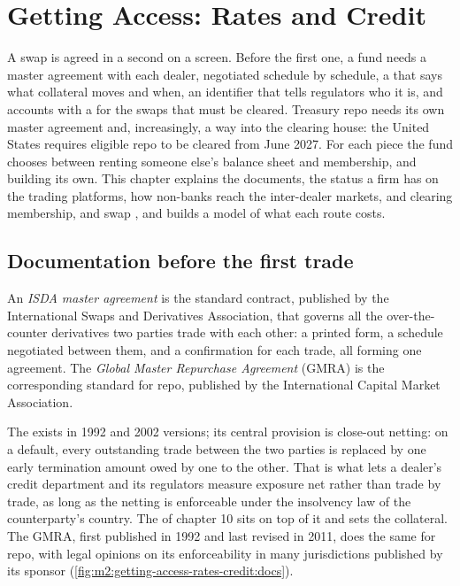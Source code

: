\chapter{Getting Access: Rates and Credit}\label{ch:m2:getting-access-rates-credit}

A swap is agreed in a second on a screen. Before the first one, a fund needs a master
agreement with each dealer, negotiated schedule by schedule, a  that
says what collateral moves and when, an identifier that tells regulators who it is, and
accounts with a  for the swaps that must be cleared. Treasury repo needs
its own master agreement and, increasingly, a way into the clearing house: the United
States requires eligible repo to be cleared from June 2027. For each piece the fund
chooses between renting someone else's balance sheet and membership, and building its
own. This chapter explains the documents, the status a firm has on the trading
platforms, how non-banks reach the inter-dealer markets,  and clearing
membership, and swap , and builds a model of what each route costs.

\section{Documentation before the first trade}

\begin{definition}\label{def:m2:getting-access-rates-credit:isda}
An \emph{ISDA master agreement} is the standard contract,
published by the International Swaps and Derivatives Association, that governs all the
over-the-counter derivatives two parties trade with each other: a printed form, a
schedule negotiated between them, and a confirmation for each trade, all forming one
agreement. The \emph{Global Master Repurchase Agreement} (GMRA) is the corresponding standard for repo, published by the
International Capital Market Association.
\end{definition}

The  exists in 1992 and 2002 versions; its central provision is
close-out netting: on a default, every outstanding trade between the two parties is
replaced by one early termination amount owed by one to the other. That is what lets a
dealer's credit department and its regulators measure exposure net rather than trade by
trade, as long as the netting is enforceable under the insolvency law of the
counterparty's country. The  of chapter 10 sits on top of it and
sets the collateral. The GMRA, first published in 1992 and last revised in 2011, does
the same for repo, with legal opinions on its enforceability in many jurisdictions
published by its sponsor (\cref{fig:m2:getting-access-rates-credit:docs}).

